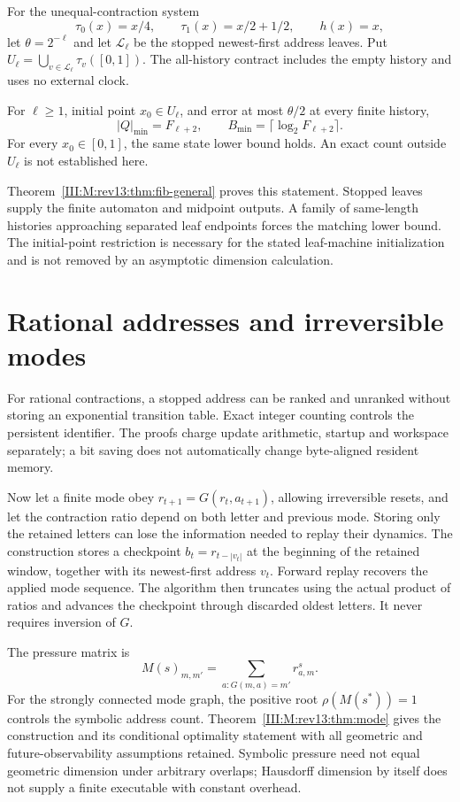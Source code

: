 For the unequal-contraction system
\[
 \tau_0(x)=x/4,\qquad \tau_1(x)=x/2+1/2,\qquad h(x)=x,
\]
let $\theta=2^{-\ell}$ and let $\mathcal L_\ell$ be the stopped
newest-first address leaves. Put
$U_\ell=\bigcup_{v\in\mathcal L_\ell}\tau_v([0,1])$.
The all-history contract includes the empty history and uses no external clock.

\begin{theorem}
For $\ell\ge1$, initial point $x_0\in U_\ell$, and error at most
$\theta/2$ at every finite history,
\[
 |Q|_{\min}=F_{\ell+2},\qquad
 B_{\min}=\lceil\log_2F_{\ell+2}\rceil.
\]
For every $x_0\in[0,1]$, the same state lower bound holds.
An exact count outside $U_\ell$ is not established here.
\end{theorem}
Theorem~\ref{III:M:rev13:thm:fib-general} proves this statement. Stopped
leaves supply the finite automaton and midpoint outputs. A family of
same-length histories approaching separated leaf endpoints forces the
matching lower bound. The initial-point restriction is necessary for the
stated leaf-machine initialization and is not removed by an asymptotic
dimension calculation.

\section{Rational addresses and irreversible modes}
For rational contractions, a stopped address can be ranked and unranked
without storing an exponential transition table. Exact integer counting
controls the persistent identifier. The proofs charge update arithmetic,
startup and workspace separately; a bit saving does not automatically
change byte-aligned resident memory.

Now let a finite mode obey $r_{t+1}=G(r_t,a_{t+1})$, allowing irreversible
resets, and let the contraction ratio depend on both letter and previous
mode. Storing only the retained letters can lose the information needed
to replay their dynamics. The construction stores a checkpoint
$b_t=r_{t-|v_t|}$ at the beginning of the retained window, together with
its newest-first address $v_t$. Forward replay recovers the applied mode
sequence. The algorithm then truncates using the actual product of
ratios and advances the checkpoint through discarded oldest letters.
It never requires inversion of $G$.

The pressure matrix is
\[
 M(s)_{m,m'}=\sum_{a:G(m,a)=m'}r_{a,m}^{s}.
\]
For the strongly connected mode graph, the positive root
$\rho(M(s^*))=1$ controls the symbolic address count. Theorem~\ref{III:M:rev13:thm:mode}
gives the construction and its conditional optimality statement with
all geometric and future-observability assumptions retained. Symbolic
pressure need not equal geometric dimension under arbitrary overlaps;
Hausdorff dimension by itself does not supply a finite executable with
constant overhead.

